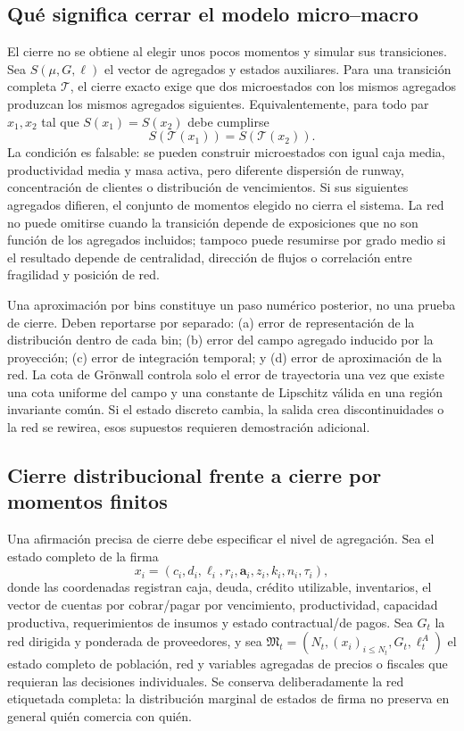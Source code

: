 \documentclass[11pt,a4paper]{article}
\begin{document}
\subsection{Qué significa cerrar el modelo micro--macro}
El cierre no se obtiene al elegir unos pocos momentos y simular sus transiciones. Sea $S(\mu,G,\ell)$ el vector de agregados y estados auxiliares. Para una transición completa $\mathcal T$, el cierre exacto exige que dos microestados con los mismos agregados produzcan los mismos agregados siguientes. Equivalentemente, para todo par $x_1,x_2$ tal que $S(x_1)=S(x_2)$ debe cumplirse
\begin{equation}
S(\mathcal T(x_1))=S(\mathcal T(x_2)).
\label{eq:fiber_test}
\end{equation}
La condición es falsable: se pueden construir microestados con igual caja media, productividad media y masa activa, pero diferente dispersión de runway, concentración de clientes o distribución de vencimientos. Si sus siguientes agregados difieren, el conjunto de momentos elegido no cierra el sistema. La red no puede omitirse cuando la transición depende de exposiciones que no son función de los agregados incluidos; tampoco puede resumirse por grado medio si el resultado depende de centralidad, dirección de flujos o correlación entre fragilidad y posición de red.

Una aproximación por bins constituye un paso numérico posterior, no una prueba de cierre. Deben reportarse por separado: (a) error de representación de la distribución dentro de cada bin; (b) error del campo agregado inducido por la proyección; (c) error de integración temporal; y (d) error de aproximación de la red. La cota de Grönwall controla solo el error de trayectoria una vez que existe una cota uniforme del campo y una constante de Lipschitz válida en una región invariante común. Si el estado discreto cambia, la salida crea discontinuidades o la red se rewirea, esos supuestos requieren demostración adicional.

\subsection{Cierre distribucional frente a cierre por momentos finitos}
Una afirmación precisa de cierre debe especificar el nivel de agregación. Sea el estado completo de la firma
\[
x_i=(c_i,d_i,\ell_i,r_i,\mathbf a_i,z_i,k_i,n_i,\tau_i),
\]
donde las coordenadas registran caja, deuda, crédito utilizable, inventarios, el vector de cuentas por cobrar/pagar por vencimiento, productividad, capacidad productiva, requerimientos de insumos y estado contractual/de pagos. Sea $G_t$ la red dirigida y ponderada de proveedores, y sea $\mathfrak M_t=(N_t,(x_i)_{i\leq N_t},G_t,\ell_t^A)$ el estado completo de población, red y variables agregadas de precios o fiscales que requieran las decisiones individuales. Se conserva deliberadamente la red etiquetada completa: la distribución marginal de estados de firma no preserva en general quién comercia con quién.
\end{document}
